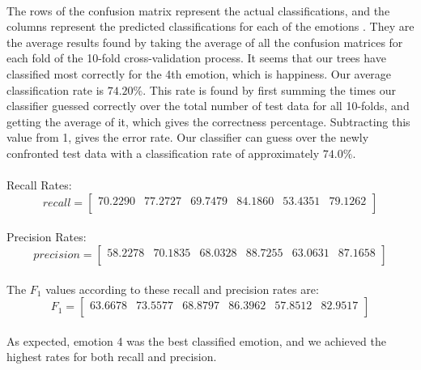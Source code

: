 \documentclass[a4paper,12pt,oneside,final]{report}
\begin{document}
\paragraph{}
The rows of the confusion matrix represent the actual classifications, and the columns represent the predicted classifications for each of the emotions .  They are the average results found by taking the average of all the confusion matrices for each fold of the 10-fold cross-validation process. It seems that our trees have classified most correctly for the 4th emotion, which is happiness. Our average classification rate is   $74.20\%$. This rate is found by first summing the times our classifier guessed correctly over the total number of test data for  all 10-folds, and getting the average of it, which gives the correctness percentage. Subtracting this value from 1, gives the error rate. Our classifier can guess over the newly confronted test data with a classification rate of approximately $74.0\%$.  \\
\paragraph{}
Recall Rates:
\[
recall = \left[\begin{array}{cccccc}
70.2290   &77.2727  & 69.7479  & 84.1860 &  53.4351&   79.1262 \\

\end{array}
\right]
\]
\paragraph{}
Precision Rates:
\[
precision = \left[\begin{array}{cccccc}
58.2278 &  70.1835  & 68.0328  & 88.7255  & 63.0631 &  87.1658 \\
\end{array}
\right]
\]
\paragraph{}
The $F_{1}$ values according to these recall and precision rates are: 
\[
F_{1} = \left[\begin{array}{cccccc}
63.6678 &  73.5577 &  68.8797 &  86.3962 &  57.8512 &  82.9517 \\
\end{array}
\right]
\]
\paragraph{}
As expected, emotion 4 was the best classified emotion, and we achieved the highest rates for both recall and precision.
\end{document}
